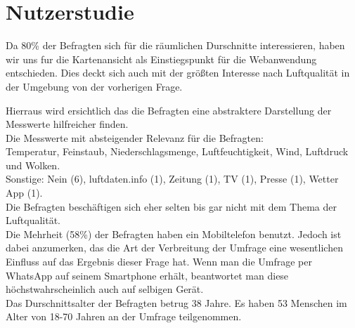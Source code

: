 \section{Nutzerstudie}



\noindent{}
Da 80\% der Befragten sich für die räumlichen Durschnitte interessieren, 
haben wir uns fur die Kartenansicht als Einstiegspunkt für die \gls{Webanwendung} entschieden. 
Dies deckt sich auch mit der größten Interesse nach Luftqualität in der Umgebung von der vorherigen Frage.
\\

\noindent{} 

\noindent{}
Hierraus wird ersichtlich das die Befragten eine abstraktere Darstellung der Messwerte hilfreicher finden.
\\

\noindent{}
Die Messwerte mit absteigender Relevanz für die Befragten: 
\\Temperatur, Feinstaub, Niederschlagsmenge, Luftfeuchtigkeit, Wind, Luftdruck und Wolken.
\\ 

\noindent{}
Sonstige: Nein (6), luftdaten.info (1), Zeitung (1), TV (1), Presse (1), Wetter App (1).
\\

\noindent{}
Die Befragten beschäftigen sich eher selten bis gar nicht mit dem Thema der Luftqualität.
\\

\noindent{}
Die Mehrheit (58\%) der Befragten haben ein Mobiltelefon benutzt. 
Jedoch ist dabei anzumerken, das die Art der Verbreitung der Umfrage eine wesentlichen Einfluss auf das Ergebnis dieser Frage hat. 
Wenn man die Umfrage per WhatsApp auf seinem Smartphone erhält, beantwortet man diese höchstwahrscheinlich auch auf selbigen Gerät.
\\

\noindent{}
Das Durschnittsalter der Befragten betrug 38 Jahre.  
Es haben 53 Menschen im Alter von 18-70 Jahren an der Umfrage teilgenommen.





























